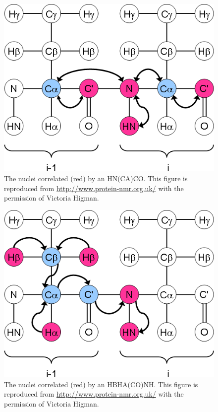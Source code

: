 \begin{figure}
  \includegraphics[scale=0.75]{figures/ccpn_hncaco}
  \caption[The nuclei correlated by an HN(CA)CO.]
          {The nuclei correlated (red) by an HN(CA)CO.
           This figure is reproduced from \url{http://www.protein-nmr.org.uk/}
           with the permission of Victoria Higman.}
  \label{ccpn_hncaco}
\end{figure}

\begin{figure}
  \includegraphics[scale=0.75]{figures/ccpn_hbhaconh}
  \caption[The nuclei correlated by an HBHA(CO)NH.]
          {The nuclei correlated (red) by an HBHA(CO)NH.
           This figure is reproduced from \url{http://www.protein-nmr.org.uk/}
           with the permission of Victoria Higman.}
  \label{ccpn_hbhaconh}
\end{figure}

